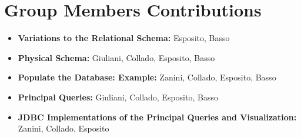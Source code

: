 \documentclass{article}
\begin{document}
\maketitle






\section{Group Members Contributions}
\begin{itemize}
	\item \textbf{Variations to the Relational Schema:} Esposito, Basso
	\item \textbf{Physical Schema:} Giuliani, Collado, Esposito, Basso
	\item \textbf{Populate the Database: Example:} Zanini, Collado, Esposito, Basso
	\item \textbf{Principal Queries:} Giuliani, Collado, Esposito, Basso
	\item \textbf{JDBC Implementations of the Principal Queries and Visualization:} Zanini, Collado, Esposito
\end{itemize}
\end{document}
